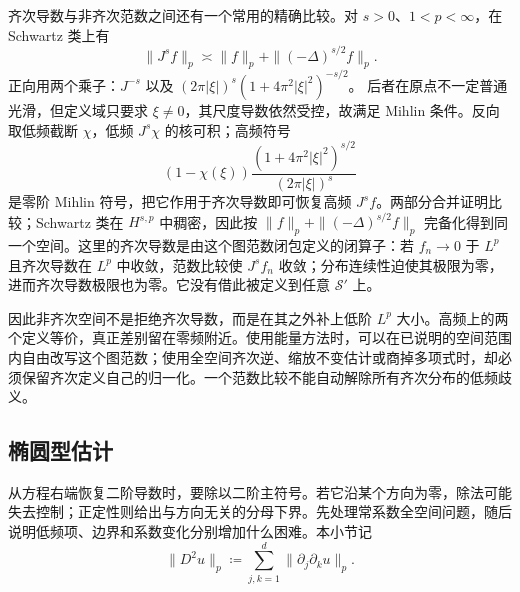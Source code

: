 \ProseParagraphBreak

齐次导数与非齐次范数之间还有一个常用的精确比较。对 \(s>0\)、\(1<p<\infty\)，在 Schwartz 类上有
\[
 \|J^sf\|_p\asymp\|f\|_p+\|(-\Delta)^{s/2}f\|_p.
\]
正向用两个乘子：\(J^{-s}\) 以及
\((2\pi|\xi|)^s(1+4\pi^2|\xi|^2)^{-s/2}\)。
后者在原点不一定普通光滑，但定义域只要求 \(\xi\ne0\)，其尺度导数依然受控，故满足 Mihlin 条件。反向取低频截断 \(\chi\)，低频 \(J^s\chi\) 的核可积；高频符号
\[
 (1-\chi(\xi))\frac{(1+4\pi^2|\xi|^2)^{s/2}}{(2\pi|\xi|)^s}
\]
是零阶 Mihlin 符号，把它作用于齐次导数即可恢复高频 \(J^sf\)。两部分合并证明比较；Schwartz 类在 \(H^{s,p}\) 中稠密，因此按
\(\|f\|_p+\|(-\Delta)^{s/2}f\|_p\) 完备化得到同一个空间。这里的齐次导数是由这个图范数闭包定义的闭算子：若 \(f_n\to0\) 于 \(L^p\) 且齐次导数在 \(L^p\) 中收敛，范数比较使 \(J^sf_n\) 收敛；分布连续性迫使其极限为零，进而齐次导数极限也为零。它没有借此被定义到任意 \(\mathcal S'\) 上。

\ProseParagraphBreak

因此非齐次空间不是拒绝齐次导数，而是在其之外补上低阶 \(L^p\) 大小。高频上的两个定义等价，真正差别留在零频附近。使用能量方法时，可以在已说明的空间范围内自由改写这个图范数；使用全空间齐次逆、缩放不变估计或商掉多项式时，却必须保留齐次定义自己的归一化。一个范数比较不能自动解除所有齐次分布的低频歧义。

\subsection{椭圆型估计}
\label{b2:subsec:220303}

从方程右端恢复二阶导数时，要除以二阶主符号。若它沿某个方向为零，除法可能失去控制；正定性则给出与方向无关的分母下界。先处理常系数全空间问题，随后说明低频项、边界和系数变化分别增加什么困难。本小节记
\[
 \|D^2u\|_p\coloneqq\sum_{j,k=1}^d\|\partial_j\partial_ku\|_p.
\]

